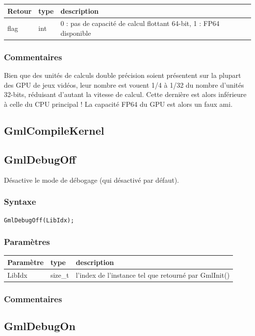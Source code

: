 \documentclass[a4paper,12pt]{article}
\begin{document}
\medskip

\begin{tabular}{|m{2cm}|m{1.5cm}|m{10.5cm}|}
\hline
Retour     & type   & description \\
\hline
flag       & int    & 0 : pas de capacité de calcul flottant 64-bit, 1 : FP64 disponible \\
\hline
\end{tabular}
\subsubsection*{Commentaires}
Bien que des unités de calculs double précision soient présentent sur la plupart des GPU de jeux vidéos, leur nombre est vouent 1/4 à 1/32 du nombre d'unités 32-bits, réduisant d'autant la vitesse de calcul.
Cette dernière est alors inférieure à celle du CPU principal !
La capacité FP64 du GPU est alors un faux ami.

\subsection{GmlCompileKernel}

\subsection{GmlDebugOff}

Désactive le mode de débogage (qui désactivé par défaut).

\subsubsection*{Syntaxe}

{\tt GmlDebugOff(LibIdx);}
\subsubsection*{Paramètres}

\begin{tabular}{|m{2cm}|m{1.5cm}|m{10.5cm}|}
\hline
Paramètre  & type    & description \\
\hline
LibIdx     & size\_t & l'index de l'instance tel que retourné par GmlInit() \\
\hline
\end{tabular}
\subsubsection*{Commentaires}


\subsection{GmlDebugOn}
\end{document}
